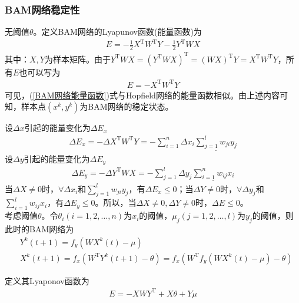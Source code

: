         \subsubsection{BAM网络稳定性}
            \par
            无阈值$\theta$。定义BAM网络的Lyapunov函数(能量函数)为
            \begin{align*}
            E = -\frac{1}{2}X^\mathrm{T}W^\mathrm{T} Y - \frac{1}{2}Y^\mathrm{T}WX
            \end{align*}
            其中：$X,Y$为样本矩阵。由于$Y^\mathrm{T}WX = (Y^\mathrm{T}WX)^\mathrm{T} = (WX)^\mathrm{T}Y = X^\mathrm{T}W^\mathrm{T}Y$，所有$E$也可以写为
            \begin{align}
            \label{BAM网络能量函数}
            E = -X^\mathrm{T}W^\mathrm{T}Y
            \end{align}
            可见，(\ref{BAM网络能量函数})式与Hopfield网络的能量函数相似。由上述内容可知，样本点$(x^k,y^k)$为BAM网络的稳定状态。
            \par
            设$\Delta x$引起的能量变化为$\Delta E_x$
            \begin{align*}
            \Delta E_x = -\Delta X^\mathrm{T}W^\mathrm{T}Y = -\sum_{i=1}^n \Delta x_i \underline{\sum_{j=1}^l w_{ji}y_j}
            \end{align*}
            设$\Delta y$引起的能量变化为$\Delta E_y$
            \begin{align*}
            \Delta E_y = -\Delta Y^\mathrm{T}WX = -\sum_{j=1}^l \Delta y_j \underline{\sum_{i=1}^n w_{ij}x_i}
            \end{align*}
            当$\Delta X \neq 0$时，$\forall \Delta x_i$和$\sum\limits_{j=1}^l w_{ji}y_j$，有$\Delta E_x \leqslant 0$；当$\Delta Y \neq 0$时，$\forall \Delta y_j$和$\sum\limits_{i=1}^l w_{ij}x_i$，有$\Delta E_y \leqslant 0$。所以，当$\Delta X \neq 0,\Delta Y \neq 0$时，$\Delta E \leqslant 0$。\\
            考虑阈值$\theta$。令$\theta_i(i=1,2,\dots,n)$为$x_i$的阈值，$\mu_j(j=1,2,\dots,l)$为$y_j$的阈值，则此时的BAM网络为
            \begin{align*}
            & Y^k(t+1) = f_y(W X^k(t) - \mu)\\
            & X^k(t+1) = f_x(W^\mathrm{T}Y^k(t+1) - \theta) = f_x(W^\mathrm{T}f_y(WX^k(t)-\mu)-\theta)
            \end{align*}
            \par
            定义其Lyaponov函数为
            \begin{align*}
            E = -XWY^\mathrm{T} + X\theta + Y\mu
            \end{align*}
